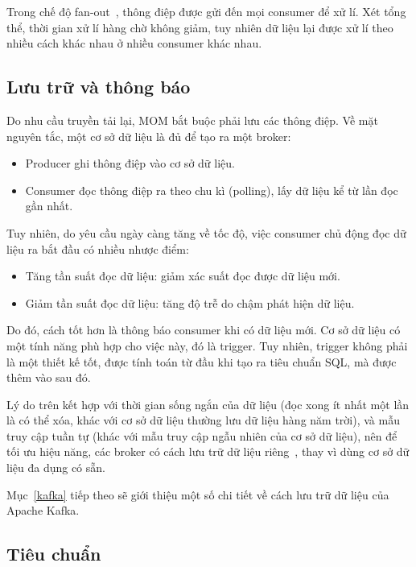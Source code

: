 \documentclass{article}
\begin{document}
Trong chế độ fan-out~\cite{waitingforcode2019}, thông điệp được gửi đến mọi
consumer để xử lí. Xét tổng thể, thời gian xử lí hàng chờ không giảm, tuy nhiên
dữ liệu lại được xử lí theo nhiều cách khác nhau ở nhiều consumer khác nhau.

\subsection{Lưu trữ và thông báo}

Do nhu cầu truyền tải lại, MOM bắt buộc phải lưu các thông điệp. Về mặt nguyên
tắc, một cơ sở dữ liệu là đủ để tạo ra một broker:

\begin{itemize}
    \item Producer ghi thông điệp vào cơ sở dữ liệu.
    \item Consumer đọc thông điệp ra theo chu kì (polling), lấy dữ liệu kể từ
        lần đọc gần nhất.
\end{itemize}

Tuy nhiên, do yêu cầu ngày càng tăng về tốc độ, việc consumer chủ động đọc dữ
liệu ra bắt đầu có nhiều nhược điểm:

\begin{itemize}
    \item Tăng tần suất đọc dữ liệu: giảm xác suất đọc được dữ liệu mới.
    \item Giảm tần suất đọc dữ liệu: tăng độ trễ do chậm phát hiện dữ liệu.
\end{itemize}

Do đó, cách tốt hơn là thông báo consumer khi có dữ liệu mới. Cơ sở dữ liệu có
một tính năng phù hợp cho việc này, đó là trigger. Tuy nhiên, trigger không phải
là một thiết kế tốt, được tính toán từ đầu khi tạo ra tiêu chuẩn SQL, mà được
thêm vào sau đó.

Lý do trên kết hợp với thời gian sống ngắn của dữ liệu (đọc xong ít nhất một lần
là có thể xóa, khác với cơ sở dữ liệu thường lưu dữ liệu hàng năm trời), và mẫu
truy cập tuần tự (khác với mẫu truy cập ngẫu nhiên của cơ sở dữ liệu), nên để
tối ưu hiệu năng, các broker có cách lưu trữ dữ liệu
riêng~\cite{monitor_stream}, thay vì dùng cơ sở dữ liệu đa dụng có sẵn.

Mục~\ref{kafka} tiếp theo sẽ giới thiệu một số chi tiết về cách lưu trữ dữ liệu
của Apache Kafka.

\subsection{Tiêu chuẩn}
\end{document}
